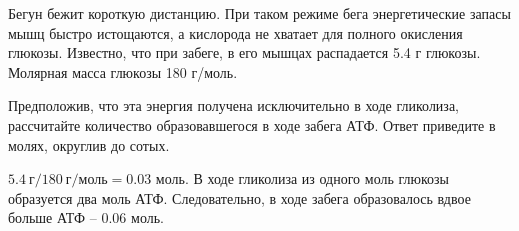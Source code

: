 
Бегун бежит короткую
дистанцию. При таком режиме бега энергетические запасы мышц быстро истощаются,
а кислорода не хватает для полного окисления глюкозы. Известно, что при забеге,
в его мышцах распадается 5.4 г глюкозы. Молярная масса глюкозы 180 г/моль.

Предположив, что эта энергия получена исключительно в ходе гликолиза, рассчитайте количество образовавшегося в ходе забега АТФ. Ответ приведите в
молях, округлив до сотых.

\solutionSection

$5.4 \:\text{г} / 180 \: \text{г} / \text{моль} = 0.03$ моль. В ходе гликолиза из одного моль глюкозы 
образуется два моль АТФ. Следовательно, в ходе забега образовалось вдвое больше АТФ – 0.06 моль.

